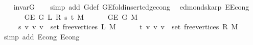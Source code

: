 \begin{isabellebody}
%
\isadelimproof
\ \ %
\endisadelimproof
%
\isatagproof
{}\isamarkupfalse%
\ invar{\isacharunderscore}{\kern0pt}G{}{\isacharunderscore}{\kern0pt}{}\isanewline
\ \ \isamarkupfalse%
\ {\isacharparenleft}{\kern0pt}simp\ add{\isacharcolon}{\kern0pt}\ G{}{\isacharunderscore}{\kern0pt}{}{\isacharunderscore}{\kern0pt}def\ G{\isachardot}{\kern0pt}E{\isacharunderscore}{\kern0pt}fold{\isacharunderscore}{\kern0pt}insert{\isacharunderscore}{\kern0pt}edge{\isacharunderscore}{\kern0pt}cong{\isacharparenright}{\kern0pt}%
\endisatagproof
{\isafoldproof}%
%
\isadelimproof
\isanewline
%
\endisadelimproof
%
\isadeliminvisible
\isanewline
%
\endisadeliminvisible
%
\isataginvisible
{}\isamarkupfalse%
\ {\isacharparenleft}{\kern0pt}\ edmonds{\isacharunderscore}{\kern0pt}karp{\isacharparenright}{\kern0pt}\ E{}{\isacharunderscore}{\kern0pt}{}{\isacharunderscore}{\kern0pt}E{}{\isacharunderscore}{\kern0pt}{}{\isacharunderscore}{\kern0pt}cong{\isacharcolon}{\kern0pt}\isanewline
\ \ \isanewline
\ \ \ \ {\isachardoublequoteopen}G{\isachardot}{\kern0pt}E\ {\isacharparenleft}{\kern0pt}G{}{\isacharunderscore}{\kern0pt}{}\ L\ R\ s\ t\ M{\isacharparenright}{\kern0pt}\ {\isacharequal}{\kern0pt}\isanewline
\ \ \ \ \ G{\isachardot}{\kern0pt}E\ {\isacharparenleft}{\kern0pt}G{}{\isacharunderscore}{\kern0pt}{}\ M{\isacharparenright}{\kern0pt}\ {\isasymunion}\isanewline
\ \ \ \ \ {\isacharbraceleft}{\kern0pt}{\isacharbraceleft}{\kern0pt}s{\isacharcomma}{\kern0pt}\ v{\isacharbraceright}{\kern0pt}\ {\isacharbar}{\kern0pt}v{\isachardot}{\kern0pt}\ v\ {\isasymin}\ set\ {\isacharparenleft}{\kern0pt}free{\isacharunderscore}{\kern0pt}vertices\ L\ M{\isacharparenright}{\kern0pt}{\isacharbraceright}{\kern0pt}\ {\isasymunion}\isanewline
\ \ \ \ \ {\isacharbraceleft}{\kern0pt}{\isacharbraceleft}{\kern0pt}t{\isacharcomma}{\kern0pt}\ v{\isacharbraceright}{\kern0pt}\ {\isacharbar}{\kern0pt}v{\isachardot}{\kern0pt}\ v\ {\isasymin}\ set\ {\isacharparenleft}{\kern0pt}free{\isacharunderscore}{\kern0pt}vertices\ R\ M{\isacharparenright}{\kern0pt}{\isacharbraceright}{\kern0pt}{\isachardoublequoteclose}%
\endisataginvisible
{\isafoldinvisible}%
%
\isadeliminvisible
\isanewline
%
\endisadeliminvisible
%
\isadelimproof
\ \ %
\endisadelimproof
%
\isatagproof
{}\isamarkupfalse%
\ {\isacharparenleft}{\kern0pt}simp\ add{\isacharcolon}{\kern0pt}\ E{}{\isacharunderscore}{\kern0pt}{}{\isacharunderscore}{\kern0pt}cong\ E{}{\isacharunderscore}{\kern0pt}{}{\isacharunderscore}{\kern0pt}cong{\isacharparenright}{\kern0pt}%

\end{isabellebody}
